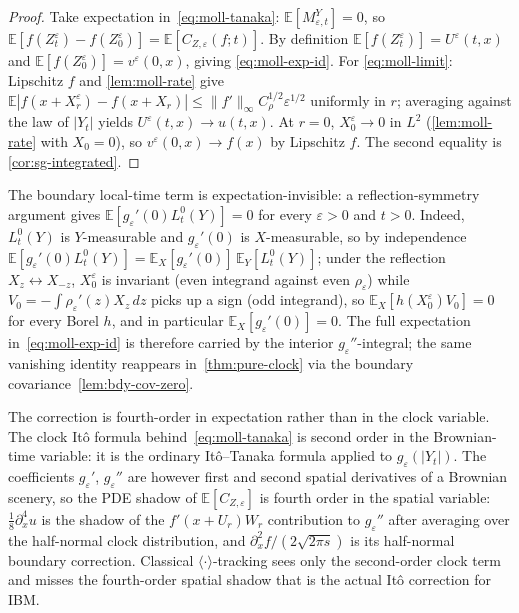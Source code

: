 \documentclass[EJP]{ejpecp}
\renewcommand{\E}{\mathbb{E}}
\newcommand{\IBM}{Z}
\begin{document}
\begin{proof}
Take expectation in~\eqref{eq:moll-tanaka}: $\E[M_{\varepsilon,t}^{Y}]=0$,
so $\E[f(\IBM_t^\varepsilon)-f(\IBM_0^\varepsilon)]=\E[C_{\IBM,\varepsilon}(f;t)]$.
By definition $\E[f(\IBM_t^\varepsilon)]=U^\varepsilon(t,x)$ and
$\E[f(\IBM_0^\varepsilon)]=v^\varepsilon(0,x)$, giving
\eqref{eq:moll-exp-id}. For \eqref{eq:moll-limit}: Lipschitz $f$ and
\cref{lem:moll-rate} give
$\E|f(x+X^\varepsilon_r)-f(x+X_r)|\le\|f'\|_\infty C_\rho^{1/2}\varepsilon^{1/2}$
uniformly in $r$; averaging against the law of $|Y_t|$ yields
$U^\varepsilon(t,x)\to u(t,x)$. At $r=0$, $X^\varepsilon_0\to 0$ in
$L^{2}$ (\cref{lem:moll-rate} with $X_0=0$), so
$v^\varepsilon(0,x)\to f(x)$ by Lipschitz $f$. The second equality
is \cref{cor:sg-integrated}.
\end{proof}

\begin{remark}
\label{rem:lt-zero-mean}
The boundary local-time term is expectation-invisible: a
reflection-symmetry argument gives $\E[g_\varepsilon'(0)L_t^{0}(Y)]=0$
for every $\varepsilon>0$ and $t>0$. Indeed, $L_t^{0}(Y)$ is
$Y$-measurable and $g_\varepsilon'(0)$ is $X$-measurable, so by
independence $\E[g_\varepsilon'(0)L_t^{0}(Y)]=\E_X[g_\varepsilon'(0)]\,\E_Y[L_t^{0}(Y)]$;
under the reflection $X_z\leftrightarrow X_{-z}$, $X^\varepsilon_0$
is invariant (even integrand against even $\rho_\varepsilon$) while
$V_0=-\int\rho_\varepsilon'(z)X_z\,dz$ picks up a sign (odd
integrand), so $\E_X[h(X^\varepsilon_0)V_0]=0$ for every Borel $h$,
and in particular $\E_X[g_\varepsilon'(0)]=0$. The full expectation
in~\eqref{eq:moll-exp-id} is therefore carried by the interior
$g_\varepsilon''$-integral; the same vanishing identity reappears
in~\cref{thm:pure-clock} via the boundary
covariance~\cref{lem:bdy-cov-zero}.
\end{remark}

The correction is fourth-order in expectation rather than in the
clock variable. The clock It\^o formula behind~\eqref{eq:moll-tanaka}
is second order in the Brownian-time variable: it is the ordinary
It\^o--Tanaka formula applied to $g_\varepsilon(|Y_t|)$. The
coefficients $g_\varepsilon'$, $g_\varepsilon''$ are however first
and second spatial derivatives of a Brownian scenery, so the
PDE shadow of $\E[C_{\IBM,\varepsilon}]$ is fourth order in the
spatial variable: $\tfrac18\partial_x^{4}u$ is the shadow of the
$f'(x+U_r)W_r$ contribution to $g_\varepsilon''$ after averaging
over the half-normal clock distribution, and
$\partial_x^{2}f/(2\sqrt{2\pi s})$ is its half-normal boundary
correction. Classical $\langle\cdot\rangle$-tracking sees only the
second-order clock term and misses the fourth-order spatial shadow
that is the actual It\^o correction for IBM.
\end{document}
